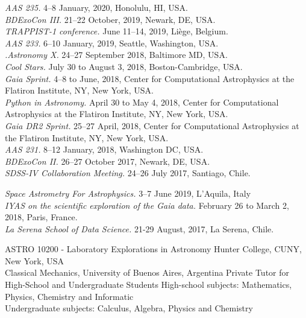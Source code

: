 \documentclass[10pt]{cv}
\begin{document}
\begin{llist}
\textit{AAS 235.} 4--8 January, 2020, Honolulu, HI, USA.\\
\textit{BDExoCon III.} 21--22 October, 2019, Newark, DE, USA.\\
\textit{TRAPPIST-1 conference.} June 11--14, 2019, Li\`ege, Belgium.\\
\textit{AAS 233.} 6--10 January, 2019, Seattle, Washington, USA.\\
\textit{.Astronomy X.} 24--27 September 2018, Baltimore MD, USA.\\
\textit{Cool Stars.} July 30 to August 3, 2018, Boston-Cambridge, USA.\\
\textit{Gaia Sprint.} 4--8 to June, 2018, Center for Computational Astrophysics at the Flatiron Institute, NY, New York, USA.\\
\textit{Python in Astronomy.}  April 30 to May 4, 2018, Center for Computational Astrophysics at the Flatiron Institute, NY, New York, USA. \\
\textit{Gaia DR2 Sprint.} 25--27 April, 2018, Center for Computational Astrophysics at the Flatiron Institute, NY, New York, USA. \\
\textit{AAS 231.} 8--12 January, 2018, Washington DC, USA.\\
\textit{BDExoCon II.} 26--27 October 2017, Newark, DE, USA.\\
\textit{SDSS-IV Collaboration Meeting.} 24--26 July 2017, Santiago, Chile.

\textit{Space Astrometry For Astrophysics.} 3--7 June 2019, L'Aquila, Italy\\
\textit{IYAS on the scientific exploration of the Gaia data.} February 26 to March 2, 2018, Paris, France.\\
\textit{La Serena School of Data Science.} 21-29 August, 2017, La Serena, Chile.



ASTRO 10200 - Laboratory Explorations in Astronomy
Hunter College, CUNY, New York, USA\\
Classical Mechanics, University of Buenos Aires, Argentina
Private Tutor for High-School and Undergraduate Students
High-school subjects: Mathematics, Physics, Chemistry and Informatic\\
Undergraduate subjects: Calculus, Algebra, Physics and Chemistry 


\end{llist}
\end{document}
